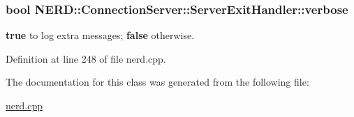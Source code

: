 \hypertarget{classNERD_1_1ConnectionServer_1_1ServerExitHandler_ac25e75d9b69963b6c0624099b8d6ec15}{
\subsubsection[{verbose}]{\setlength{\rightskip}{0pt plus 5cm}bool {\bf \-N\-E\-R\-D\-::\-Connection\-Server\-::\-Server\-Exit\-Handler\-::verbose}}}
\label{classNERD_1_1ConnectionServer_1_1ServerExitHandler_ac25e75d9b69963b6c0624099b8d6ec15}


{\bfseries true} to log extra messages; {\bfseries false} otherwise. 



\-Definition at line 248 of file nerd.\-cpp.



\-The documentation for this class was generated from the following file\-:\begin{DoxyCompactItemize}
\item 
\hyperlink{nerd_8cpp}{nerd.\-cpp}\end{DoxyCompactItemize}
